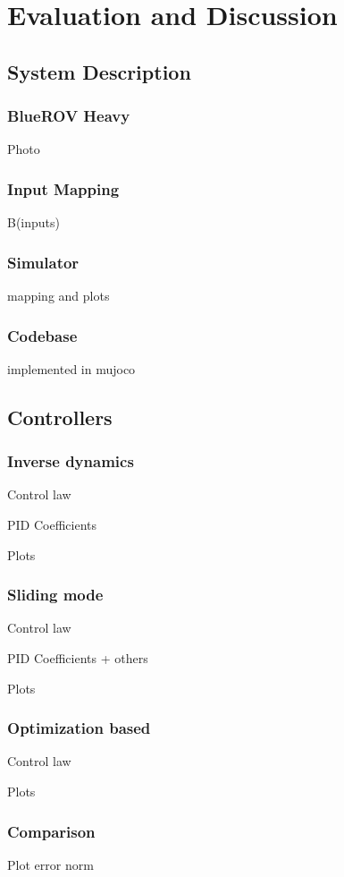 \chapter{Evaluation and Discussion}
\label{chap:eval}

\section{System Description}

    \subsection{BlueROV Heavy}
    Photo

    \subsection{Input Mapping}
    B(inputs)

    \subsection{Simulator}
    mapping and plots

    \subsection{Codebase}
    implemented in mujoco

\section{Controllers}

    \subsection{Inverse dynamics}

    Control law

    PID Coefficients

    Plots

    \subsection{Sliding mode}

    Control law

    PID Coefficients + others

    Plots

    \subsection{Optimization based}

    Control law

    Plots

    \subsection{Comparison}
    
    Plot error norm

